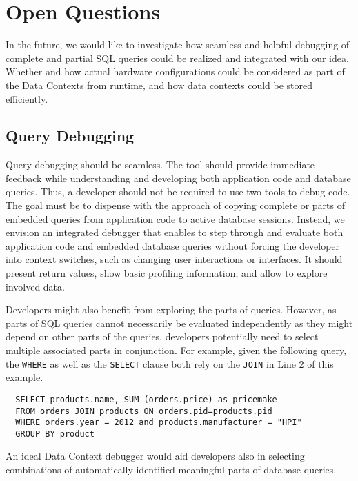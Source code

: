 \section{Open Questions} \label{sec:OPEN_QUESTIONS}
In the future, we would like to investigate how seamless and helpful debugging of complete and partial SQL queries could be realized and integrated with our idea.
Whether and how actual hardware configurations could be considered as part of the Data Contexts from runtime, and how data contexts could be stored efficiently.

\subsection{Query Debugging}
Query debugging should be seamless.
The tool should provide immediate feedback while understanding and developing both application code and database queries.
Thus, a developer should not be required to use two tools to debug code.
The goal must be to dispense with the approach of copying complete or parts of embedded queries from application code to active database sessions.
Instead, we envision an integrated debugger that enables to step through and evaluate both application code and embedded database queries without forcing the developer into context switches, such as changing user interactions or interfaces.
It should present return values, show basic profiling information, and allow to explore involved data.

Developers might also benefit from exploring the parts of queries.
However, as parts of SQL queries cannot necessarily be evaluated independently as they might depend on other parts of the queries, developers potentially need to select multiple associated parts in conjunction.
For example, given the following query, the \texttt{WHERE} as well as the \texttt{SELECT} clause both rely on the \texttt{JOIN} in Line 2 of this example.
\lstset{language=SQL}
\begin{lstlisting}
  SELECT products.name, SUM (orders.price) as pricemake
  FROM orders JOIN products ON orders.pid=products.pid
  WHERE orders.year = 2012 and products.manufacturer = "HPI"
  GROUP BY product
\end{lstlisting}
An ideal Data Context debugger would aid developers also in selecting combinations of automatically identified meaningful parts of database queries.

